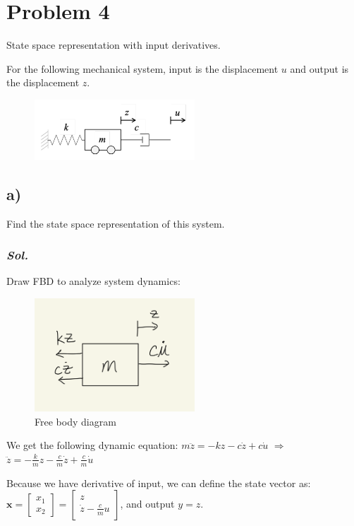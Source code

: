 \section{Problem 4}
State space representation with input derivatives.

For the following mechanical system, input is the displacement $u$ and output is the displacement $z$.

\begin{figure}[htp]
    \centering
    \includegraphics[width=6cm]{images/Q4.png}
\end{figure}

\subsection{a)}
Find the state space representation of this system.
\subsubsection{\textit{ Sol. }}

Draw FBD to analyze system dynamics: 
\begin{figure}[htp]
    \centering
    \includegraphics[width=6cm]{images/Q4_FBD.png}
    \caption{Free body diagram}
    \label{fig:Q4FBD}
\end{figure}

We get the following dynamic equation: $m\ddot{z} = -kz-c\dot{z}+c\dot{u}$ $\Rightarrow$ $\ddot{z} = -\frac{k}{m}z-\frac{c}{m}\dot{z}+\frac{c}{m}\dot{u}$

Because we have derivative of input, we can define the state vector as: $\textbf{x} = 
\begin{bmatrix}
    x_1\\
    x_2
\end{bmatrix} = 
\begin{bmatrix}
    z\\
    \dot{z} - \frac{c}{m}u
\end{bmatrix}$, and output $y = z$.

